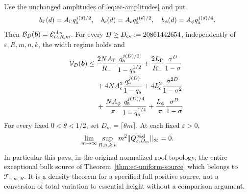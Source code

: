 \begin{corollary}
\label{cor:cv-ec-normalized}
Use the unchanged amplitudes of \eqref{eq:ec-amplitudes} and put
\[
 b_\Gamma(d)=A_\Gamma q_{\rm a}^{j(d)/2},\quad
 b_c(d)=A_cq_{\rm a}^{j(d)/2},\quad
 b_\phi(d)=A_\phi q_{\rm a}^{j(d)/4}.
\]
Then $\mathcal B_D(\boldsymbol b)=\mathcal E^{\rm obs}_{D,R,m}$.
For every $D\ge D_{\rm cv}:=20861442654$, independently of
$\varepsilon,R,m,n,k$, the width regime holds and
\begin{align}\label{eq:cv-explicit-budget}
 \mathcal V_D(\boldsymbol b)\le{}&
 \frac{2NA_\Gamma}{R_-}
          \frac{q_{\rm a}^{j(D)/2}}{1-q_{\rm a}^{1/2}}
 +\frac{2L_\Gamma}{R_-}\frac{\sigma^D}{1-\sigma}\notag\\
 &+4NA_c^2\frac{q_{\rm a}^{j(D)}}{1-q_{\rm a}}
 +4L_c^2\frac{\sigma^{2D}}{1-\sigma^2}\notag\\
 &+\frac{NA_\phi}{\pi}
          \frac{q_{\rm a}^{j(D)/4}}{1-q_{\rm a}^{1/4}}
 +\frac{L_\phi}{\pi}\frac{\sigma^D}{1-\sigma}.
\end{align}
For every fixed $0<\theta<1/2$, set $D_m=\lceil\theta m\rceil$.
At each fixed $\varepsilon>0$,
\begin{equation}\label{eq:cv-normalized-limit}
 \lim_{m\to\infty}\sup_{R,n,k,h}
             m^2\|Q^{\rm bad}_{\varepsilon,D_m}\|_\infty=0.
\end{equation}
In particular this pays, in the original normalized roof topology,
the entire exceptional bulk source of
Theorem~\ref{thm:ec-uniform-source} which belongs to
$\mathcal T_{\varepsilon,m,R}$.  It is a density theorem for a
specified full positive source, not a conversion of total variation
to essential height without a comparison argument.
\end{corollary}
